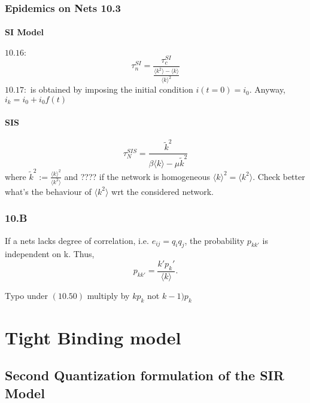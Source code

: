 \documentclass[a4paper,11pt,twoside]{report} %
\begin{document}
\subsection{Epidemics on Nets 10.3}

\subsubsection{SI Model}
$10.16:$ $$\tau_n^{SI}=\frac{\tau_{c}^{SI}}{\frac{\langle k^2 \rangle -\langle k\rangle}{\langle k\rangle^2}}$$
\newline
$10.17:$ is obtained by imposing the initial condition $i(t=0)=i_0$. Anyway, $i_k=i_0+i_0f(t)$

\subsubsection{SIS}

$$\tau_N^{SIS}=\frac{\tilde{k}^2}{\beta\langle k\rangle-\mu\tilde{k}^2}$$ 
\newline
where $\tilde{k}^2:=\frac{\langle k\rangle^2}{\langle k^2 \rangle }$ and ???? if the network is homogeneous
$\langle k\rangle^2=\langle k^2 \rangle .$
Check better what's the behaviour of $\langle k^2 \rangle $ wrt the considered network.

\subsection{10.B}

If a nets lacks degree of correlation, i.e. $e_{ij}=q_iq_j$, the probability $p_{kk'}$ is independent on k. Thus, $$p_{kk'}=\frac{k'p_k'}{\langle k\rangle}.$$

Typo under $(10.50)$ multiply by $kp_k$ not $k-1)p_k$





\clearpage


\chapter{Tight Binding model}


\section{Second Quantization formulation of the SIR Model}





\end{document}
